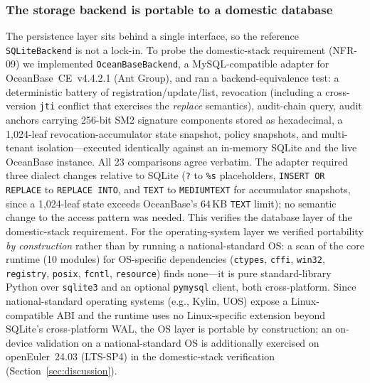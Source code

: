 \documentclass[10pt,twocolumn]{IEEEtran}
\begin{document}
\subsubsection*{The storage backend is portable to a domestic database}
The persistence layer sits behind a single interface, so the reference
\texttt{SQLiteBackend} is not a lock-in. To probe the domestic-stack
requirement (NFR-09) we implemented \texttt{OceanBaseBackend}, a
MySQL-compatible adapter for OceanBase~CE~v4.4.2.1 (Ant Group), and
ran a backend-equivalence test: a deterministic battery of
registration/update/list, revocation (including a cross-version
\texttt{jti} conflict that exercises the \emph{replace} semantics),
audit-chain query, audit anchors carrying 256-bit SM2 signature
components stored as hexadecimal, a 1{,}024-leaf revocation-accumulator
state snapshot, policy snapshots, and multi-tenant isolation---executed
identically against an in-memory SQLite and the live OceanBase
instance. All 23 comparisons agree verbatim. The adapter required three
dialect changes relative to SQLite (\texttt{?} to \texttt{\%s}
placeholders, \texttt{INSERT OR REPLACE} to \texttt{REPLACE INTO}, and
\texttt{TEXT} to \texttt{MEDIUMTEXT} for accumulator snapshots, since a
1{,}024-leaf state exceeds OceanBase's 64\,KB \texttt{TEXT} limit);
no semantic change to the access pattern was needed. This verifies the
database layer of the domestic-stack requirement. For the
operating-system layer we verified portability \emph{by construction}
rather than by running a national-standard OS: a scan of the core
runtime (10 modules) for OS-specific dependencies (\texttt{ctypes},
\texttt{cffi}, \texttt{win32}, \texttt{registry}, \texttt{posix},
\texttt{fcntl}, \texttt{resource}) finds none---it is pure
standard-library Python over \texttt{sqlite3} and an optional
\texttt{pymysql} client, both cross-platform. Since national-standard
operating systems (e.g., Kylin, UOS) expose a Linux-compatible ABI and
the runtime uses no Linux-specific extension beyond SQLite's
cross-platform WAL, the OS layer is portable by construction; an
on-device validation on a national-standard OS is additionally
exercised on openEuler~24.03 (LTS-SP4) in the domestic-stack
verification (Section~\ref{sec:discussion}).
\end{document}
